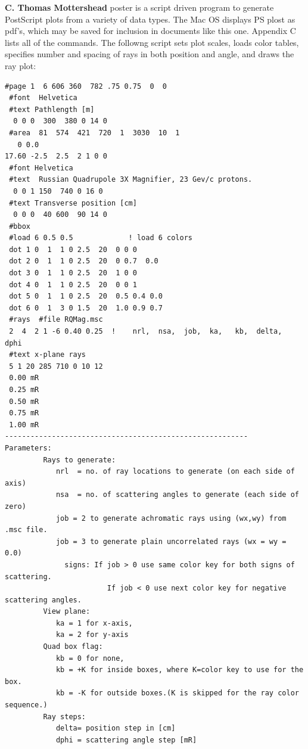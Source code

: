 \documentclass[11pt]{article} %
\newcommand{\bvb}{\begin{verbatim}}
\begin{document}
\begin{center}  {\bf C. Thomas Mottershead }
{\sc poster} is a script driven program to generate PostScript plots from a variety of data types. The Mac OS displays PS plost as pdf's, which may be saved for inclusion in documents like this one. Appendix C lists all of the commands. The followng script sets plot scales, 
loads color tables, specifies number and spacing of rays in both position and angle, and draws the ray plot:
 \bvb
#page 1  6 606 360  782 .75 0.75  0  0 
 #font  Helvetica
 #text Pathlength [m]
  0 0 0  300  380 0 14 0
 #area  81  574  421  720  1  3030  10  1
   0 0.0 
17.60 -2.5  2.5  2 1 0 0
 #font Helvetica
 #text  Russian Quadrupole 3X Magnifier, 23 Gev/c protons.
  0 0 1 150  740 0 16 0
 #text Transverse position [cm]
  0 0 0  40 600  90 14 0
 #bbox
 #load 6 0.5 0.5             ! load 6 colors
 dot 1 0  1  1 0 2.5  20  0 0 0
 dot 2 0  1  1 0 2.5  20  0 0.7  0.0
 dot 3 0  1  1 0 2.5  20  1 0 0
 dot 4 0  1  1 0 2.5  20  0 0 1
 dot 5 0  1  1 0 2.5  20  0.5 0.4 0.0
 dot 6 0  1  3 0 1.5  20  1.0 0.9 0.7
 #rays  #file RQMag.msc
 2  4  2 1 -6 0.40 0.25  !    nrl,  nsa,  job,  ka,   kb,  delta,  dphi
 #text x-plane rays
 5 1 20 285 710 0 10 12
 0.00 mR
 0.25 mR
 0.50 mR
 0.75 mR
 1.00 mR
---------------------------------------------------------
Parameters:
         Rays to generate:
            nrl  = no. of ray locations to generate (on each side of axis)
            nsa  = no. of scattering angles to generate (each side of zero)
            job = 2 to generate achromatic rays using (wx,wy) from .msc file.
            job = 3 to generate plain uncorrelated rays (wx = wy = 0.0)
              signs: If job > 0 use same color key for both signs of scattering.
                        If job < 0 use next color key for negative scattering angles.
         View plane:
            ka = 1 for x-axis,
            ka = 2 for y-axis
         Quad box flag:
            kb = 0 for none,
            kb = +K for inside boxes, where K=color key to use for the box.
            kb = -K for outside boxes.(K is skipped for the ray color sequence.)
         Ray steps:
            delta= position step in [cm]
            dphi = scattering angle step [mR]
\end{verbatim}  
    

\end{center}
\end{document}
